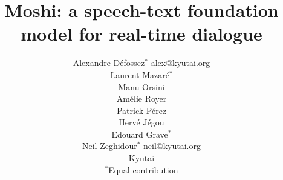 \documentclass[twoside,11pt]{article}
\begin{document}
\title{Moshi: a speech-text foundation model for real-time dialogue}

\author{%
  \name Alexandre D\'efossez$^{*}$ \email alex@kyutai.org \\
  \vspace{-0.6cm}
  \AND
  \name Laurent Mazar\'e$^{*}$ \\
  \vspace{-0.6cm}
  \AND
  \name Manu Orsini \\
  \vspace{-0.6cm}
  \AND
  \name Am\'elie Royer \\
  \vspace{-0.6cm}
  \AND
  \name Patrick P\'erez \\
  \vspace{-0.6cm}
  \AND
  \name Herv\'e J\'egou \\
  \vspace{-0.6cm}
  \AND
  \name Edouard Grave$^{*}$ \\
  \vspace{-0.6cm}
  \AND
  \name Neil Zeghidour$^{*}$ \email neil@kyutai.org \\
  {\addr Kyutai}\\
  {\addr $^*$Equal contribution}\\
}


\maketitle
\end{document}
